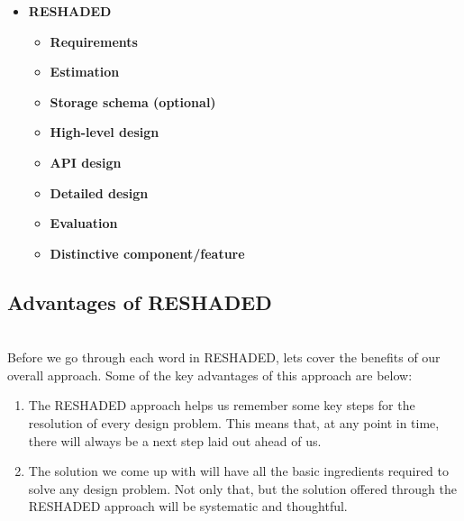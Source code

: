 \vspace{0.3cm}
\begin{itemize}
\item \textbf{RESHADED}
\begin{itemize}
\item \textbf{Requirements}
\end{itemize}
\begin{itemize}
\item \textbf{Estimation}
\end{itemize}
\begin{itemize}
\item \textbf{Storage schema (optional)}
\end{itemize}
\begin{itemize}
\item \textbf{High-level design}
\end{itemize}
\begin{itemize}
\item \textbf{API design}
\end{itemize}
\begin{itemize}
\item \textbf{Detailed design}
\end{itemize}
\begin{itemize}
\item \textbf{Evaluation}
\end{itemize}
\begin{itemize}
\item \textbf{Distinctive component/feature}
\end{itemize}
\end{itemize}

\subsection{Advantages of RESHADED}\label{9Y_5TdnQjEZ0cW4EXAH5d}
\\
Before we go through each word in RESHADED, let\textquotesingle s cover the benefits of our overall approach. Some of the key advantages of this approach are below:

\begin{enumerate}
\item
\protect{}\label{UFsADQ36cEM0mulGIyWlf}
The RESHADED approach helps us remember some key steps for the resolution of every design problem. This means that, at any point in time, there will always be a next step laid out ahead of us.
\item
\protect{}\label{G4eLYq_SknCsrLbmWJwc7}
The solution we come up with will have all the basic ingredients required to solve any design problem. Not only that, but the solution offered through the RESHADED approach will be systematic and thoughtful.
\end{enumerate}

